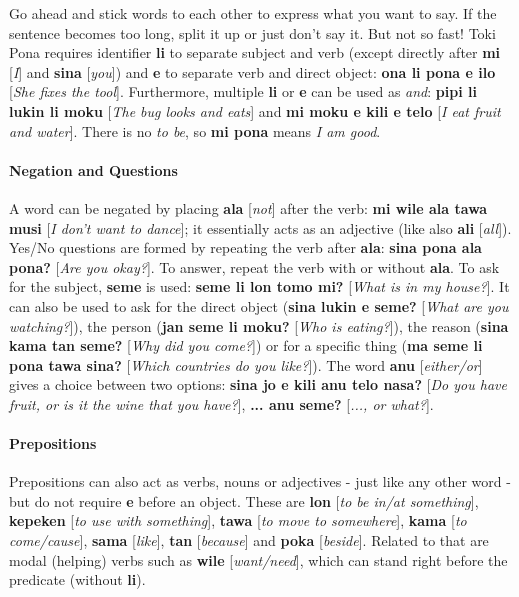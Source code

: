 \documentclass[10pt,a4paper]{article}
\begin{document}
\begin{multicols}{2}
Go ahead and stick words to each other to express what you want to say. If the sentence becomes too long, split it up or just don't say it. But not so fast! Toki Pona requires identifier \textbf{li} to separate subject and verb (except directly after \textbf{mi} [\textit{I}] and \textbf{sina} [\textit{you}]) and \textbf{e} to separate verb and direct object: \textbf{ona li pona e ilo} [\textit{She fixes the tool}]. Furthermore, multiple \textbf{li} or \textbf{e} can be used as \textit{and}: \textbf{pipi li lukin li moku} [\textit{The bug looks and eats}] and \textbf{mi moku e kili e telo} [\textit{I eat fruit and water}]. There is no \textit{to be}, so \textbf{mi pona} means \textit{I am good}.

\paragraph{Negation and Questions}

A word can be negated by placing \textbf{ala} [\textit{not}] after the verb: \textbf{mi wile ala tawa musi} [\textit{I don't want to dance}]; it essentially acts as an adjective (like also \textbf{ali} [\textit{all}]). Yes/No questions are formed by repeating the verb after \textbf{ala}: \textbf{sina pona ala pona?} [\textit{Are you okay?}]. To answer, repeat the verb with or without \textbf{ala}. To ask for the subject, \textbf{seme} is used: \textbf{seme li lon tomo mi?} [\textit{What is in my house?}]. It can also be used to ask for the direct object (\textbf{sina lukin e seme?} [\textit{What are you watching?}]), the person (\textbf{jan seme li moku?} [\textit{Who is eating?}]), the reason (\textbf{sina kama tan seme?} [\textit{Why did you come?}]) or for a specific thing (\textbf{ma seme li pona tawa sina?} [\textit{Which countries do you like?}]). The word \textbf{anu} [\textit{either/or}] gives a choice between two options: \textbf{sina jo e kili anu telo nasa?} [\textit{Do you have fruit, or is it the wine that you have?}], \textbf{... anu seme?} [\textit{..., or what?}].
\end{multicols}

\paragraph{Prepositions}

Prepositions can also act as verbs, nouns or adjectives - just like any other word - but do not require \textbf{e} before an object. These are \textbf{lon} [\textit{to be in/at something}], \textbf{kepeken} [\textit{to use with something}], \textbf{tawa} [\textit{to move to somewhere}], \textbf{kama} [\textit{to come/cause}], \textbf{sama} [\textit{like}], \textbf{tan} [\textit{because}] and \textbf{poka} [\textit{beside}]. Related to that are modal (helping) verbs such as \textbf{wile} [\textit{want/need}], which can stand right before the predicate (without \textbf{li}).
\end{document}
